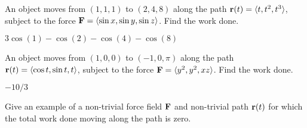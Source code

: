 \begin{exercises}
\exercise An object moves from $(1,1,1)$ to
$(2,4,8)$ along the path ${\bf r}(t)=\langle t,t^2,t^3\rangle$,
subject to the force ${\bf F}=\langle \sin x,\sin y,\sin z\rangle$. 
Find the work
done. 
\begin{answer} $3\cos(1)-\cos(2)-\cos(4)-\cos(8)$
\end{answer}

\exercise An object moves from $(1,0,0)$ to
$(-1,0,\pi)$ along the path ${\bf r}(t)=\langle \cos t,\sin t, t\rangle$,
subject to the force ${\bf F}=\langle y^2,y^2,xz\rangle$. 
Find the work
done. 
\begin{answer} $-10/3$
\end{answer}

\exercise Give an example of a non-trivial force field ${\bf F}$ and
non-trivial path ${\bf r}(t)$ for which the total work done moving along
the path is zero.

\end{exercises}


